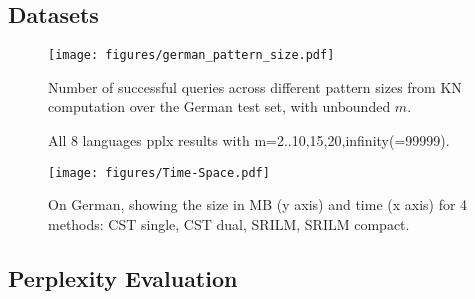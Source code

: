 
\subsection{Datasets}
\begin{table}
\caption{Data statistics after tokenizing, sentence-splitting, and removing markups, and numberizing. Tokens and sentence counts refer to the training partition. }
\end{table}

\begin{figure}
\texttt{[image: figures/german\_pattern\_size.pdf]}
\caption{Number of successful queries across different pattern sizes from KN computation over the German test set, with unbounded $m$.}
\end{figure}

\begin{figure}

\caption{All 8 languages pplx results with m=2..10,15,20,infinity(=99999).}
\end{figure}

\begin{figure}
\texttt{[image: figures/Time-Space.pdf]}
\caption{On German, showing the size in MB (y axis) and time (x axis) for 4 methods: CST single, CST dual, SRILM, SRILM compact.}
\end{figure}





\subsection{Perplexity Evaluation}




